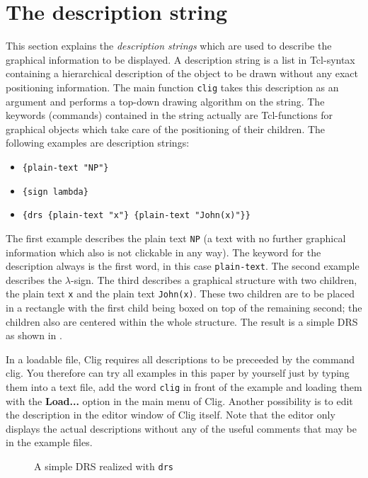 \section{The description string}

This section explains the {\it description strings\/} which are used to
describe the graphical information to be displayed.  A description
string is a list in Tcl-syntax containing a hierarchical description of
the object to be drawn without any exact positioning information. The
main function {\tt clig} takes this description as an argument and
performs a top-down drawing algorithm on the string. The keywords
(commands) contained in the string actually are Tcl-functions for
graphical objects which take care of the positioning of their
children. The following examples are description strings:

\begin{itemize}
\item \verb'{plain-text "NP"}'
\item \verb'{sign lambda}'
\item \verb'{drs {plain-text "x"} {plain-text "John(x)"}}'  
\end{itemize}

The first example describes the plain text {\tt NP} (a text with no
further graphical information which also is not clickable in any way).
The keyword for the description always is the first word, in this case
{\tt plain-text}. The second example describes the $\lambda$-sign. The
third describes a graphical structure with two children, the plain text
{\tt x} and the plain text {\tt John(x)}. These two children are to be
placed in a rectangle with the first child being boxed on top of the
remaining second; the children also are centered within the whole
structure. The result is a simple DRS as shown in .

In a loadable file, {\sf Clig} requires all descriptions to be
preceeded by the command {\sf clig}.  You therefore can try all
examples in this paper by yourself just by typing them into a text
file, add the word {\tt clig} in front of the example and loading them
with the {\bf Load...} option in the main menu of {\sc Clig}. Another
possibility is to edit the description in the editor window of {\sc
Clig} itself. Note that the editor only displays the actual descriptions
without any of the useful comments that may be in the example files.


\begin{figure}[h]
\begin{center}
\leavevmode
{}
\caption{A simple DRS realized with {\tt drs}}
\label{drs1}
\end{center}
\end{figure}

